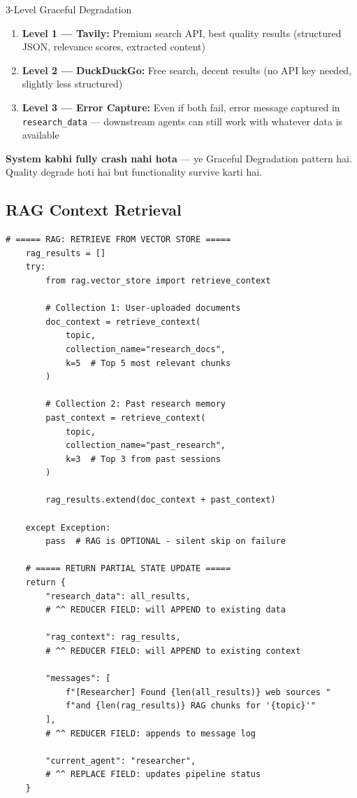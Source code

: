 \documentclass[11pt,a4paper,twoside]{report}
\begin{document}
\begin{dangerbox}{3-Level Graceful Degradation}
\begin{enumerate}
    \item \textbf{Level 1 --- Tavily:} Premium search API, best quality results (structured JSON, relevance scores, extracted content)
    \item \textbf{Level 2 --- DuckDuckGo:} Free search, decent results (no API key needed, slightly less structured)
    \item \textbf{Level 3 --- Error Capture:} Even if both fail, error message captured in \texttt{research\_data} --- downstream agents can still work with whatever data is available
\end{enumerate}
\textbf{System kabhi fully crash nahi hota} --- ye Graceful Degradation pattern hai. Quality degrade hoti hai but functionality survive karti hai.
\end{dangerbox}

\subsection{RAG Context Retrieval}

\begin{lstlisting}[style=pythonstyle,caption={researcher.py --- ChromaDB Retrieval}]
    # ===== RAG: RETRIEVE FROM VECTOR STORE =====
    rag_results = []
    try:
        from rag.vector_store import retrieve_context

        # Collection 1: User-uploaded documents
        doc_context = retrieve_context(
            topic,
            collection_name="research_docs",
            k=5  # Top 5 most relevant chunks
        )

        # Collection 2: Past research memory
        past_context = retrieve_context(
            topic,
            collection_name="past_research",
            k=3  # Top 3 from past sessions
        )

        rag_results.extend(doc_context + past_context)

    except Exception:
        pass  # RAG is OPTIONAL - silent skip on failure

    # ===== RETURN PARTIAL STATE UPDATE =====
    return {
        "research_data": all_results,
        # ^^ REDUCER FIELD: will APPEND to existing data

        "rag_context": rag_results,
        # ^^ REDUCER FIELD: will APPEND to existing context

        "messages": [
            f"[Researcher] Found {len(all_results)} web sources "
            f"and {len(rag_results)} RAG chunks for '{topic}'"
        ],
        # ^^ REDUCER FIELD: appends to message log

        "current_agent": "researcher",
        # ^^ REPLACE FIELD: updates pipeline status
    }
\end{lstlisting}
\end{document}

